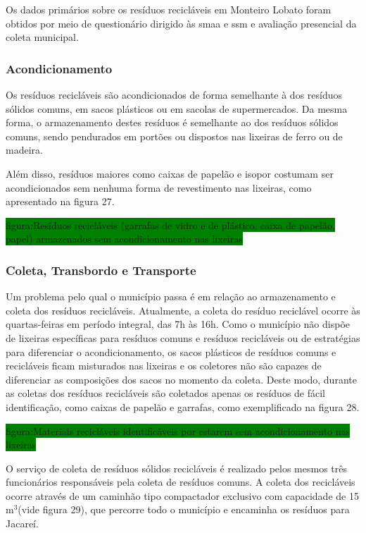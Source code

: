 	Os dados primários sobre os resíduos recicláveis em Monteiro Lobato foram obtidos por meio de questionário dirigido às \gls{smaa} e \gls{ssm} e avaliação presencial da coleta municipal.
	
	\subsubsection{Acondicionamento}
	
	Os resíduos recicláveis são acondicionados de forma semelhante à dos resíduos sólidos comuns, em sacos plásticos ou em sacolas de supermercados. Da mesma forma, o armazenamento destes resíduos é semelhante ao dos resíduos sólidos comuns, sendo pendurados em portões ou dispostos nas lixeiras de ferro ou de madeira.
	
	Além disso, resíduos maiores como caixas de papelão e isopor costumam ser acondicionados sem nenhuma forma de revestimento nas lixeiras, como apresentado na figura 27.
	
	\colorbox{green}{figura:Resíduos recicláveis (garrafas de vidro e de plástico, caixa de papelão, papel) armazenados sem acondicionamento nas lixeiras}
	
	\subsubsection{Coleta, Transbordo e Transporte}
	
	Um problema pelo qual o município passa é em relação ao armazenamento e coleta dos resíduos recicláveis. Atualmente, a coleta do resíduo reciclável ocorre às quartas-feiras em período integral, das 7h às 16h.
	Como o município não dispõe de lixeiras específicas para resíduos comuns e resíduos recicláveis ou de estratégias para diferenciar o acondicionamento, os sacos plásticos de resíduos comuns e recicláveis ficam misturados nas lixeiras e os coletores não são capazes de diferenciar as composições dos sacos no momento da coleta. Deste modo, durante as coletas dos resíduos recicláveis são coletados apenas os resíduos de fácil identificação, como caixas de papelão e garrafas, como exemplificado na figura 28.
	
	\colorbox{green}{figura:Materiais recicláveis identificáveis por estarem sem acondicionamento nas lixeiras}
	
	O serviço de coleta de resíduos sólidos recicláveis é realizado pelos mesmos três funcionários responsáveis pela coleta de resíduos comuns. A coleta dos recicláveis ocorre através de um caminhão tipo compactador exclusivo com capacidade de 15 m$^{3}$(vide figura 29), que percorre todo o município e encaminha os resíduos para Jacareí.
		
